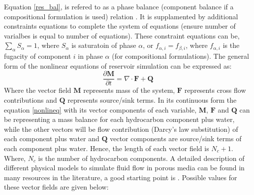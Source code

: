 Equation \ref{res_bal}, is refered to as a phase balance (component balance if a compositional formulation is used) relation . It is supplamented by
additional constraints equations to complete the system of equations (ensure number of varialbes is equal to number of equations). These constraint
equations can be, $\sum_{\alpha}S_{\alpha} = 1$, where  $S_{\alpha}$ is saturatoin of phase $\alpha$, or $f_{\alpha,i} = f_{\beta,i}$, where $f_{\alpha,i}$
is the fugacity of component $i$ in phase $\alpha$ (for compositional formulations). 
The general form of the nonlinear equations of reservoir simulation can be expressed as\supercite{roy}:
\begin{equation}
	\frac{\partial\mathbf{M}}{\partial t} = \nabla \cdot \mathbf{F} + \mathbf{Q}
	\label{nonlineq}
\end{equation}
Where the vector field $\mathbf{M}$ represents mass of the system, $\mathbf{F}$ represents cross flow contributions and $\mathbf{Q}$ represents source/sink terms.
In its continuous form the equation \ref{nonlineq} with its vector components of each variable, $\mathbf{M}$, $\mathbf{F}$ and $\mathbf{Q}$ can be representing a mass balance 
for each hydrocarbon component plus water, while the other vectors will be flow contribution (Darcy's law substitution) of each component plus water and $\mathbf{Q}$ 
vector components are source/sink terms of each component plus water. Hence, the length of each vector field is $N_{c} + 1$. Where, $N_{c}$ is the number of hydrocarbon components.
A detailed description of different physical models to simulate fluid flow in porous media can be found in many resources in the literature, a good starting point is \cite{cao,aziz}.
Possible values for these vector fields are given below:

